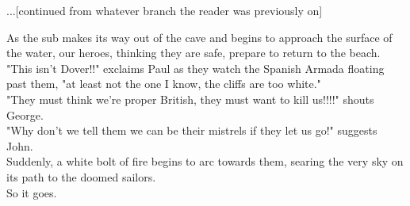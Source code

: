 \documentclass{article}
\begin{document}
...[continued from whatever branch the reader was previously on]

As the sub makes its way out of the cave and begins to approach the surface of the water, our heroes, thinking they are safe, prepare to return to the beach.\\

"This isn't Dover!!" exclaims Paul as they watch the Spanish Armada floating past them, "at least not the one I know, the cliffs are too white."\\

"They must think we're proper British, they must want to kill us!!!!" shouts George.\\

"Why don't we tell them we can be their mistrels if they let us go!" suggests John.\\

Suddenly, a white bolt of fire begins to arc towards them, searing the very sky on its path to the doomed sailors.\\

So it goes.
\end{document}

